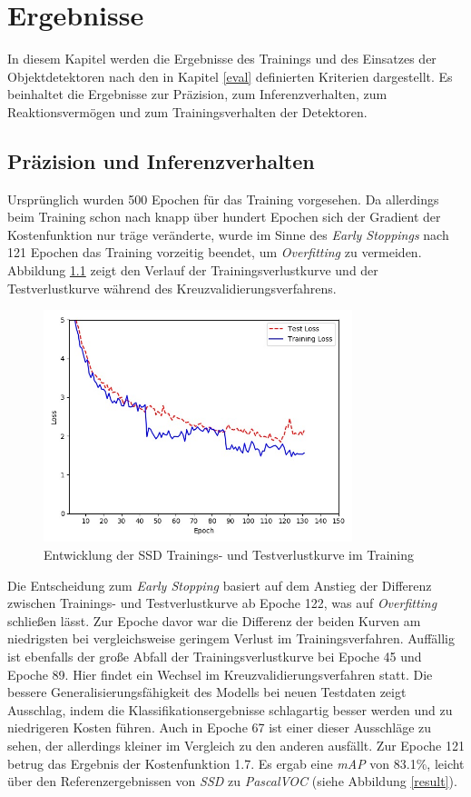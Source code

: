 \chapter{Ergebnisse} \label{evaluation}

In diesem Kapitel werden die Ergebnisse des Trainings und des Einsatzes der Objektdetektoren nach den in Kapitel \ref{eval} definierten Kriterien dargestellt. Es beinhaltet die Ergebnisse zur Präzision, zum Inferenzverhalten, zum Reaktionsvermögen und zum Trainingsverhalten der Detektoren.

\section{Präzision und Inferenzverhalten}

Ursprünglich wurden 500 Epochen für das Training vorgesehen. Da allerdings beim Training schon nach knapp über hundert Epochen sich der Gradient der Kostenfunktion nur träge veränderte, wurde im Sinne des \textit{Early Stoppings} nach 121 Epochen das Training vorzeitig beendet, um \textit{Overfitting} zu vermeiden. Abbildung \ref{ssdloss} zeigt den Verlauf der Trainingsverlustkurve und der Testverlustkurve während des Kreuzvalidierungsverfahrens.

\begin{figure}[H]
	\begin{center}
		\includegraphics[width=9cm]{Bilder/ssdloss.jpeg} 
		\caption{Entwicklung der SSD Trainings- und Testverlustkurve im Training}
		\label{ssdloss}
	\end{center}
\end{figure}

Die Entscheidung zum \textit{Early Stopping} basiert auf dem Anstieg der Differenz zwischen Trainings- und Testverlustkurve ab Epoche 122, was auf \textit{Overfitting} schließen lässt. Zur Epoche davor war die Differenz der beiden Kurven am niedrigsten bei vergleichsweise geringem Verlust im Trainingsverfahren. Auffällig ist ebenfalls der große Abfall der Trainingsverlustkurve bei Epoche 45 und Epoche 89. Hier findet ein Wechsel im Kreuzvalidierungsverfahren statt. Die bessere Generalisierungsfähigkeit des Modells bei neuen Testdaten zeigt Ausschlag, indem die Klassifikationsergebnisse schlagartig besser werden und zu niedrigeren Kosten führen. Auch in Epoche 67 ist einer dieser Ausschläge zu sehen, der allerdings kleiner im Vergleich zu den anderen ausfällt. Zur Epoche 121 betrug das Ergebnis der Kostenfunktion 1.7. Es ergab eine \textit{mAP} von 83.1\%, leicht über den Referenzergebnissen von \textit{SSD} zu \textit{PascalVOC} (siehe Abbildung \ref{result}).

